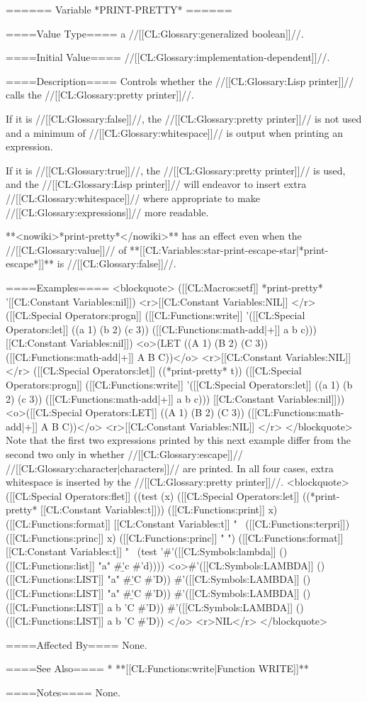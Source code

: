 ====== Variable *PRINT-PRETTY* ======

====Value Type====
a //[[CL:Glossary:generalized boolean]]//.

====Initial Value====
//[[CL:Glossary:implementation-dependent]]//.

====Description====
Controls whether the //[[CL:Glossary:Lisp printer]]// calls the //[[CL:Glossary:pretty printer]]//.

If it is //[[CL:Glossary:false]]//, the //[[CL:Glossary:pretty printer]]// is not used and a minimum of //[[CL:Glossary:whitespace]]// is output when printing an expression.

If it is //[[CL:Glossary:true]]//, the //[[CL:Glossary:pretty printer]]// is used, and the //[[CL:Glossary:Lisp printer]]// will endeavor to insert extra //[[CL:Glossary:whitespace]]// where appropriate to make //[[CL:Glossary:expressions]]// more readable.

**<nowiki>*print-pretty*</nowiki>** has an effect even when the //[[CL:Glossary:value]]// of **[[CL:Variables:star-print-escape-star|*print-escape*]]** is //[[CL:Glossary:false]]//.

====Examples====
<blockquote>
([[CL:Macros:setf]] *print-pretty* '[[CL:Constant Variables:nil]]) 
<r>[[CL:Constant Variables:NIL]] </r>
([[CL:Special Operators:progn]] 
  ([[CL:Functions:write]] '([[CL:Special Operators:let]] ((a 1) (b 2) (c 3)) ([[CL:Functions:math-add|+]] a b c))) 
  [[CL:Constant Variables:nil]])
<o>(LET ((A 1) (B 2) (C 3)) ([[CL:Functions:math-add|+]] A B C))</o>
<r>[[CL:Constant Variables:NIL]] </r>
([[CL:Special Operators:let]] ((*print-pretty* t)) 
  ([[CL:Special Operators:progn]] 
    ([[CL:Functions:write]] '([[CL:Special Operators:let]] ((a 1) (b 2) (c 3)) ([[CL:Functions:math-add|+]] a b c))) 
    [[CL:Constant Variables:nil]]))
<o>([[CL:Special Operators:LET]] ((A 1)
      (B 2)
      (C 3))
  ([[CL:Functions:math-add|+]] A B C))</o>
<r>[[CL:Constant Variables:NIL]] </r>
</blockquote>
Note that the first two expressions printed by this next example differ from the second two only in whether //[[CL:Glossary:escape]]// //[[CL:Glossary:character|characters]]// are printed. In all four cases, extra whitespace is inserted by the //[[CL:Glossary:pretty printer]]//. 
<blockquote>
([[CL:Special Operators:flet]] ((test (x) 
         ([[CL:Special Operators:let]] ((*print-pretty* [[CL:Constant Variables:t]])) 
           ([[CL:Functions:print]] x) 
           ([[CL:Functions:format]] [[CL:Constant Variables:t]] "~%
           ([[CL:Functions:terpri]]) ([[CL:Functions:princ]] x) ([[CL:Functions:princ]] " ")
           ([[CL:Functions:format]] [[CL:Constant Variables:t]] "~%
  (test '#'([[CL:Symbols:lambda]] () ([[CL:Functions:list]] "a" #\b 'c #'d))))
<o>#'([[CL:Symbols:LAMBDA]] ()
    ([[CL:Functions:LIST]] "a" #\b 'C #'D))
#'([[CL:Symbols:LAMBDA]] ()
    ([[CL:Functions:LIST]] "a" #\b 'C #'D))
#'([[CL:Symbols:LAMBDA]] ()
    ([[CL:Functions:LIST]] a b 'C #'D))
#'([[CL:Symbols:LAMBDA]] ()
    ([[CL:Functions:LIST]] a b 'C #'D)) </o>
<r>NIL</r>
</blockquote>

====Affected By====
None.

====See Also====
  * **[[CL:Functions:write|Function WRITE]]**

====Notes====
None.

 
